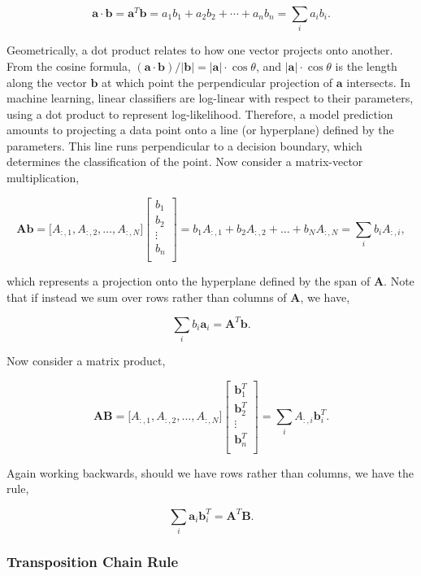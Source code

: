 \documentclass[11pt]{amsart}
\begin{document}
$$\mathbf{a}\cdot\mathbf{b} = \mathbf{a}^T\mathbf{b} = a_1b_1 + a_2b_2 + \cdots + a_nb_n = \sum_i a_ib_i.$$

Geometrically, a dot product relates to how one vector projects onto another. From the cosine formula, $(\mathbf{a}\cdot\mathbf{b})/|\mathbf{b}| = |\mathbf{a}|\cdot\cos\theta$, and $|\mathbf{a}|\cdot\cos\theta$ is the length along the vector $\mathbf{b}$ at which point the perpendicular projection of $\mathbf{a}$ intersects. In machine learning, linear classifiers are log-linear with respect to their parameters, using a dot product to represent log-likelihood. Therefore, a model prediction amounts to projecting a data point onto a line (or hyperplane) defined by the parameters. This line runs perpendicular to a decision boundary, which determines the classification of the point. Now consider a matrix-vector multiplication,

$$\mathbf{A}\mathbf{b} = \big[A_{:, 1}, A_{:, 2}, \dots, A_{:, N}\big]
\begin{bmatrix}
b_1 \\
b_2 \\
\vdots \\
b_n \\
\end{bmatrix}
= b_1A_{:, 1} + b_2A_{:, 2} + \dots + b_NA_{:, N} = \sum_{i} b_iA_{:, i},$$

which represents a projection onto the hyperplane defined by the span of $\mathbf{A}$. Note that if instead we sum over rows rather than columns of $\mathbf{A}$, we have,

$$\sum_{i} b_i\mathbf{a}_i = \mathbf{A}^T\mathbf{b}.$$

Now consider a matrix product,

$$\mathbf{A}\mathbf{B} = \big[A_{:, 1}, A_{:, 2}, \dots, A_{:, N}\big]
\begin{bmatrix}
\mathbf{b}_1^T \\
\mathbf{b}_2^T \\
\vdots \\
\mathbf{b}_n^T \\
\end{bmatrix}
= \sum_{i} A_{:, i}\mathbf{b}_i^T.
$$

Again working backwards, should we have rows rather than columns, we have the rule,

$$\sum_{i} \mathbf{a}_i\mathbf{b}_i^T = \mathbf{A}^T\mathbf{B}.$$

\subsubsection{Transposition Chain Rule}
\end{document}
